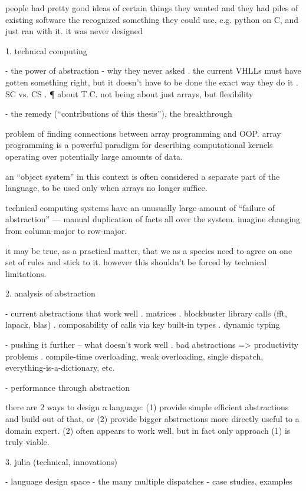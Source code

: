 
people had pretty good ideas of certain things they wanted
and they had piles of existing software
the recognized something they could use, e.g. python on C, and just ran
with it. it was never designed


1. technical computing

- the power of abstraction
- why they never asked
  . the current VHLLs must have gotten something right, but it doesn't have
    to be done the exact way they do it
  . SC vs. CS
  . ¶ about T.C. not being about just arrays, but flexibility

- the remedy (``contributions of this thesis''), the breakthrough

problem of finding connections between array programming and OOP.
array programming is a powerful paradigm for describing computational
kernels operating over potentially large amounts of data.

an ``object system'' in this context is often considered a separate
part of the language, to be used only when arrays no longer
suffice.

technical computing systems have an unusually large amount of
``failure of abstraction'' --- manual duplication of facts
all over the system. imagine changing from column-major to
row-major.

it may be true, as a practical matter, that we as a species need to agree on
one set of rules and stick to it. however this shouldn't be forced by
technical limitations.


2. analysis of abstraction

- current abstractions that work well
  . matrices
  . blockbuster library calls (fft, lapack, blas)
  . composability of calls via key built-in types
  . dynamic typing

- pushing it further -- what doesn't work well
  . bad abstractions => productivity problems
  . compile-time overloading, weak overloading, single dispatch,
    everything-is-a-dictionary, etc.

- performance through abstraction

there are 2 ways to design a language: (1) provide simple efficient abstractions
and build out of that, or (2) provide bigger abstractions more directly useful
to a domain expert. (2) often appears to work well, but in fact only approach
(1) is truly viable.

3. julia (technical, innovations)

- language design space
- the many multiple dispatches
- case studies, examples


